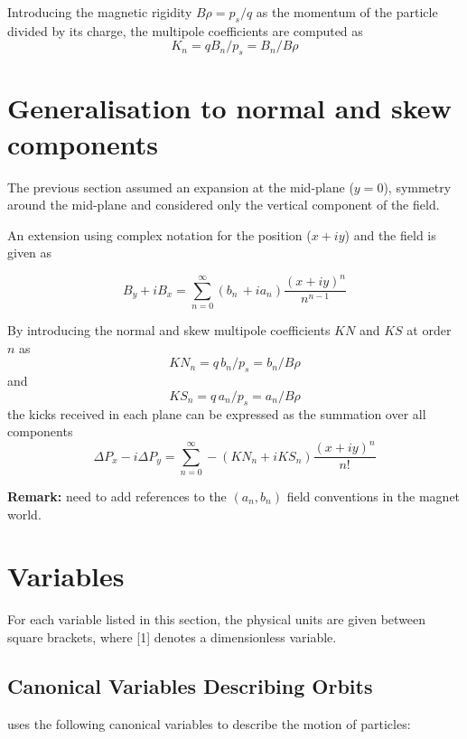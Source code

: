 Introducing the magnetic rigidity \(B \rho = p_s / q\) as the
momentum of the particle divided by its charge, the multipole
coefficients are computed as
\begin{equation}\label{eq:kn}
K_n = q B_n / p_s  =  B_n / B \rho 
\end{equation}

\section{Generalisation to normal and skew components}
\label{sec:normalskew}
The previous section assumed an expansion at the mid-plane ($y=0$), 
symmetry around the mid-plane and considered only the vertical 
component of the field. 

An extension using complex notation for the position ($x + i y$) 
and the field is given as

\begin{equation}
B_y +  i B_x =\sum_{n=0}^{\infty} (b_n\,+ia_n) \frac{(x+iy)^n}{n^{n-1}}
\end{equation}

By introducing the normal and skew multipole coefficients 
$KN$ and $KS$ at order $n$ as
\begin{equation}\label{eq:knn}
KN_n = q\,b_n / p_s  =  b_n / B \rho 
\end{equation}
and
\begin{equation}\label{eq:kns}
KS_n = q\,a_n / p_s  =  a_n / B \rho 
\end{equation}
the kicks received in each plane can be expressed as the summation 
over all components
\begin{equation}
\Delta P_x - i \Delta P_y = \sum_{n=0}^{\infty} -(KN_n + i KS_n) \frac{(x+iy)^n}{n!}
\end{equation}

{\bf Remark:} need to add references to the $(a_n,b_n)$ field conventions 
in the magnet world. 


\section{Variables}
\label{sec:variables}

For each variable listed in this section, the physical units are given
between square brackets, where [1] denotes a dimensionless variable.

\subsection{Canonical Variables Describing Orbits}
\label{subsec:tables_canon}
\madx uses the following canonical variables to describe the motion of particles: 


